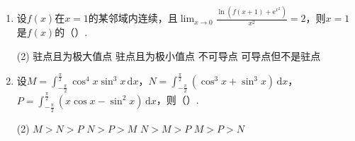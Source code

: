 \documentclass[../Main.tex]{subfiles}
\begin{document}
\begin{enumerate}
          \begin{tasks}[label=\textbf{\Alph*.}, label-width=1.5em, column-sep=1em](2)
              \task $1$
              \task $2$
              \task $3$
              \task $0$
          \end{tasks}

    \item 设$f(x)$在$x=1$的某邻域内连续，且$\lim_{x\to0}\frac{\ln\left(f(x+1)+\mathrm{e}^{x^2}\right)}{x^{2}}
              =2$，则$x=1$是$f(x)$的（\qquad）.

          \begin{tasks}[label=\textbf{\Alph*.}, label-width=1.5em, column-sep=1em](2)
              \task 驻点且为极大值点
              \task 驻点且为极小值点
              \task 不可导点
              \task 可导点但不是驻点
          \end{tasks}

    \item 设$M=\int_{-\frac{\pi}{2}}^{\frac{\pi}{2}}\cos^{4} x\sin^{3} x\,\mathrm{d}
              x$，$N=\int_{-\frac{\pi}{2}}^{\frac{\pi}{2}}\left(\cos^{3} x+\sin^{3} x\right
              )\,\mathrm{d}x$，$P=\int_{-\frac{\pi}{2}}^{\frac{\pi}{2}}\left(x\cos x-\sin^{2}
              x\right)\,\mathrm{d}x$，则（\qquad）.

          \begin{tasks}[label=\textbf{\Alph*.}, label-width=1.5em, column-sep=1em](2)
              \task $M>N>P$
              \task $N>P>M$
              \task $N>M>P$
              \task $M>P>N$
          \end{tasks}
\end{enumerate}
\end{document}
